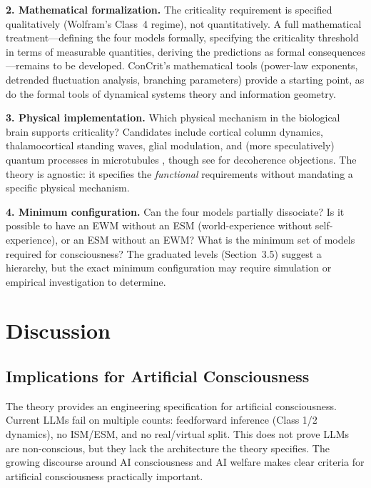 \documentclass[12pt]{article}
\begin{document}
\textbf{2. Mathematical formalization.} The criticality requirement is specified qualitatively (Wolfram's Class~4 regime), not quantitatively. A full mathematical treatment---\hspace{0pt}defining the four models formally, specifying the criticality threshold in terms of measurable quantities, deriving the predictions as formal consequences---\hspace{0pt}remains to be developed. ConCrit's mathematical tools (power-law exponents, detrended fluctuation analysis, branching parameters) provide a starting point, as do the formal tools of dynamical systems theory and information geometry.

\textbf{3. Physical implementation.} Which physical mechanism in the biological brain supports criticality? Candidates include cortical column dynamics, thalamocortical standing waves, glial modulation, and (more speculatively) quantum processes in microtubules \citep{PenroseHameroff1994}, though see \citet{Tegmark2000} for decoherence objections. The theory is agnostic: it specifies the \emph{functional} requirements without mandating a specific physical mechanism.

\textbf{4. Minimum configuration.} Can the four models partially dissociate? Is it possible to have an EWM without an ESM (world-experience without self-experience), or an ESM without an EWM? What is the minimum set of models required for consciousness? The graduated levels (Section~3.5) suggest a hierarchy, but the exact minimum configuration may require simulation or empirical investigation to determine.



\section{Discussion}


\subsection{Implications for Artificial Consciousness}

The theory provides an engineering specification for artificial consciousness. Current LLMs fail on multiple counts: feedforward inference (Class 1/2 dynamics), no ISM/ESM, and no real/virtual split. This does not prove LLMs are non-conscious, but they lack the architecture the theory specifies. The growing discourse around AI consciousness \citep{Butlin2023,Schwitzgebel2025,Birch2025} and AI welfare \citep{Long2024,Anthropic2025} makes clear criteria for artificial consciousness practically important.
\end{document}
